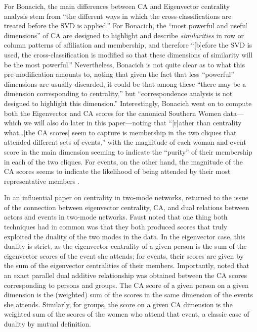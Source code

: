 \documentclass[a4paper,fleqn]{cas-sc}
\begin{document}
For Bonacich, the main differences between CA and Eigenvector centrality analysis stem from ``the different ways in which the cross-classifications are treated before the SVD is applied.'' For Bonacich, the ``most powerful and useful dimensions'' of CA are designed to highlight and describe \textit{similarities} in row or column patterns of affiliation and membership, and therefore ``[b]efore the SVD is used, the cross-classification is modified so that these dimensions of similarity will be the most powerful.'' Nevertheless, Bonacich is not quite clear as to what this pre-modification amounts to, noting that given the fact that less ``powerful'' dimensions are usually discarded, it could be that among these ``there may be a dimension corresponding to centrality,'' but ``correspondence analysis is not designed to highlight this dimension.'' Interestingly, Bonacich went on to compute both the Eigenvector and CA scores for the canonical Southern Women data---which we will also do later in this paper---noting that ``[r]ather than centrality what\ldots[the CA scores] seem to capture is membership in the two cliques that attended different sets of events,'' with the magnitude of each woman and event score in the main dimension seeming to indicate the ``purity'' of their membership in each of the two cliques. For events, on the other hand, the magnitude of the CA scores seems to indicate the likelihood of being attended by their most representative members \citep[164]{bonacich1991simultaneous}. 

In an influential paper on centrality in two-mode networks, \citet{faust1997centrality} returned to the issue of the connection between eigenvector centrality, CA, and dual relations between actors and events in two-mode networks. Faust noted that one thing both techniques had in common was that they both produced scores that truly exploited the duality of the two modes in the data. In the eigenvector case, this duality is strict, as the eigenvector centrality of a given person is the sum of the eigenvector scores of the event she attends; for events, their scores are given by the sum of the eigenvector centralities of their members. Importantly, \citet{faust1997centrality} noted that an exact parallel dual additive relationship was obtained between the CA scores corresponding to persons and groups. The CA score of a given person on a given dimension is the (weighted) sum of the scores in the same dimension of the events she attends. Similarly, for groups, the score on a given CA dimension is the weighted sum of the scores of the women who attend that event, a classic case of duality by mutual definition. 
\end{document}
